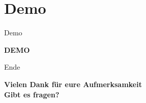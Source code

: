 \documentclass[19pt]{beamer}
\begin{document}

\section{Demo}
\begin{frame}{Demo}
	\begin{center}
		\textbf{DEMO}
	\end{center}
\end{frame}


\begin{frame}{Ende}
	\begin{center}
		\textbf{Vielen Dank f\"{u}r eure Aufmerksamkeit} \\
		\textbf{Gibt es fragen?}
	\end{center}
\end{frame}
\end{document}
